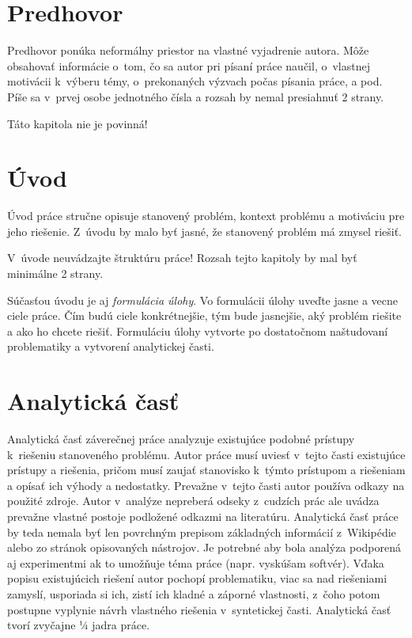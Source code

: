 \section*{Predhovor}

Predhovor ponúka neformálny priestor na vlastné vyjadrenie autora. Môže obsahovať informácie o~tom, čo sa autor pri písaní práce naučil, o~vlastnej motivácii k~výberu témy, o~prekonaných výzvach počas písania práce, a pod. Píše sa v~prvej osobe jednotného čísla a rozsah by nemal presiahnuť 2 strany.

Táto kapitola nie je povinná!


\section*{Úvod}

Úvod práce stručne opisuje stanovený problém, kontext problému a motiváciu pre jeho riešenie. Z~úvodu by malo byť jasné, že stanovený problém má zmysel riešiť.

V~úvode neuvádzajte štruktúru práce! Rozsah tejto kapitoly by mal byť minimálne 2 strany.

Súčasťou úvodu je aj \emph{formulácia úlohy}.
Vo formulácii úlohy uveďte jasne a vecne ciele práce. Čím budú ciele konkrétnejšie, tým bude jasnejšie, aký problém riešite a ako ho chcete riešiť.
Formuláciu úlohy vytvorte po dostatočnom naštudovaní problematiky a vytvorení analytickej časti.

\section*{Analytická časť}

Analytická časť záverečnej práce analyzuje existujúce podobné prístupy k~riešeniu stanoveného problému. Autor práce musí uviesť v~tejto časti existujúce prístupy a riešenia, pričom musí zaujať stanovisko k~týmto prístupom a riešeniam a opísať ich výhody a nedostatky. Prevažne v~tejto časti autor používa odkazy na použité zdroje. Autor v~analýze nepreberá odseky z~cudzích prác ale uvádza prevažne vlastné postoje podložené odkazmi na literatúru. Analytická časť práce by teda nemala byť len povrchným prepisom základných informácií z~Wikipédie alebo zo stránok opisovaných nástrojov. Je potrebné aby bola analýza podporená aj experimentmi ak to umožňuje téma práce (napr. vyskúšam softvér). Vďaka popisu existujúcich riešení autor pochopí problematiku, viac sa nad riešeniami zamyslí, usporiada si ich, zistí ich kladné a záporné vlastnosti, z~čoho potom postupne vyplynie návrh vlastného riešenia v~syntetickej časti. Analytická časť tvorí zvyčajne ¼ jadra práce.

